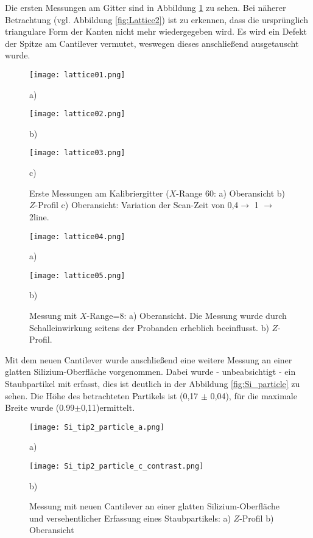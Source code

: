 Die ersten Messungen am Gitter sind in Abbildung \ref{fig:Lattice1} zu sehen. Bei näherer Betrachtung (vgl. Abbildung \ref{fig:Lattice2}) ist zu erkennen, dass die ursprünglich triangulare Form der Kanten nicht mehr wiedergegeben wird. Es wird ein Defekt der Spitze am Cantilever vermutet, weswegen dieses anschließend ausgetauscht wurde.
\begin{figure}[h]
	\centering
	\begin{minipage}{0.3\textwidth}
		\texttt{[image: lattice01.png]}
		\caption{a)}
	\end{minipage}
	\hfill
\begin{minipage}{0.3\textwidth}
		\texttt{[image: lattice02.png]}
		\caption{b)}
	\end{minipage}
	\hfill
\begin{minipage}{0.3\textwidth}
		\texttt{[image: lattice03.png]}
		\caption{c)}
	\end{minipage}
	\caption{Erste Messungen am Kalibriergitter ($X$-Range 60\mikro\metre: a) Oberansicht b) $Z$-Profil c) Oberansicht: Variation der Scan-Zeit von 0,4$\rightarrow$ 1 $\rightarrow$ 2\second\per line.}
	\label{fig:Lattice1}
\end{figure}

\begin{figure}[h]
\begin{minipage}{0.45\textwidth}
		\texttt{[image: lattice04.png]}
		\caption{a)}
	\end{minipage}
	\hfill
\begin{minipage}{0.45\textwidth}
		\texttt{[image: lattice05.png]}
		\caption{b)}
	\end{minipage}
	\caption{Messung mit $X$-Range=8\mikro\metre: a) Oberansicht. Die Messung wurde durch Schalleinwirkung seitens der Probanden erheblich beeinflusst. b) $Z$-Profil.}
\end{figure}

Mit dem neuen Cantilever wurde anschließend eine weitere Messung an einer glatten Silizium-Oberfläche vorgenommen. Dabei wurde - unbeabsichtigt - ein Staubpartikel mit erfasst, dies ist deutlich in der Abbildung \ref{fig:Si_particle} zu sehen. Die Höhe des betrachteten Partikels ist (0,17 $\pm$ 0,04)\micro\metre, für die maximale Breite wurde (0.99$\pm$0,11)\micro\metre ermittelt.
\begin{figure}[h]
	\begin{minipage}{0.45\textwidth}
		\texttt{[image: Si\_tip2\_particle\_a.png]}
		\caption{a)}
	\end{minipage}
	\hfill
	\begin{minipage}{0.45\textwidth}
		\texttt{[image: Si\_tip2\_particle\_c\_contrast.png]}
	\caption{b)}
	\end{minipage}
	\caption{Messung mit neuen Cantilever an einer glatten Silizium-Oberfläche und versehentlicher Erfassung eines Staubpartikels: a) $Z$-Profil b) Oberansicht}
\end{figure}

